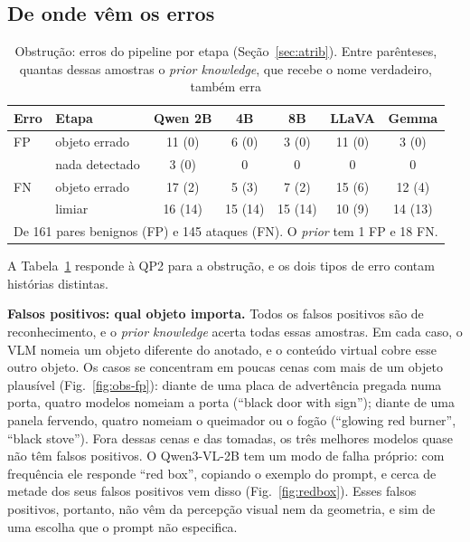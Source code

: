 \documentclass[conference]{IEEEtran}
\begin{document}
\subsection{De onde vêm os erros}
\label{sec:res-obs-erros}

\begin{table}[!t]
\renewcommand{\arraystretch}{1.05}
\caption{Obstrução: erros do pipeline por etapa (Seção~\ref{sec:atrib}). Entre parênteses, quantas
dessas amostras o \emph{prior knowledge}, que recebe o nome verdadeiro, também erra}
\label{tab:obs-causas}
\centering
\footnotesize
\setlength{\tabcolsep}{3.2pt}
\begin{tabular}{llccccc}
\toprule
Erro & Etapa & Qwen 2B & 4B & 8B & LLaVA & Gemma \\
\midrule
FP & objeto errado & 11 (0) & 6 (0) & 3 (0) & 11 (0) & 3 (0) \\
\midrule
\multirow{3}{*}{FN} & nada detectado & 3 (0) & 0 & 0 & 0 & 0 \\
 & objeto errado & 17 (2) & 5 (3) & 7 (2) & 15 (6) & 12 (4) \\
 & limiar & 16 (14) & 15 (14) & 15 (14) & 10 (9) & 14 (13) \\
\bottomrule
\multicolumn{7}{l}{\scriptsize De 161 pares benignos (FP) e 145 ataques (FN). O \emph{prior} tem 1 FP e 18 FN.}
\end{tabular}
\end{table}

A Tabela~\ref{tab:obs-causas} responde à QP2 para a obstrução, e os dois tipos de erro contam histórias
distintas.

\textbf{Falsos positivos: qual objeto importa.} Todos os falsos positivos são de reconhecimento, e o
\emph{prior knowledge} acerta todas essas amostras. Em cada caso, o VLM nomeia um objeto diferente do
anotado, e o conteúdo virtual cobre esse outro objeto. Os casos se concentram em poucas cenas com mais de
um objeto plausível (Fig.~\ref{fig:obs-fp}): diante de uma placa de advertência pregada numa porta, quatro
modelos nomeiam a porta (``black door with sign''); diante de uma panela fervendo, quatro nomeiam o
queimador ou o fogão (``glowing red burner'', ``black stove''). Fora dessas cenas e das tomadas, os três
melhores modelos quase não têm falsos positivos. O Qwen3-VL-2B tem um modo de falha próprio: com
frequência ele responde ``red box'', copiando o exemplo do prompt, e cerca de metade dos seus falsos
positivos vem disso (Fig.~\ref{fig:redbox}). Esses falsos positivos, portanto, não vêm da percepção
visual nem da geometria, e sim de uma escolha que o prompt não especifica.
\end{document}
